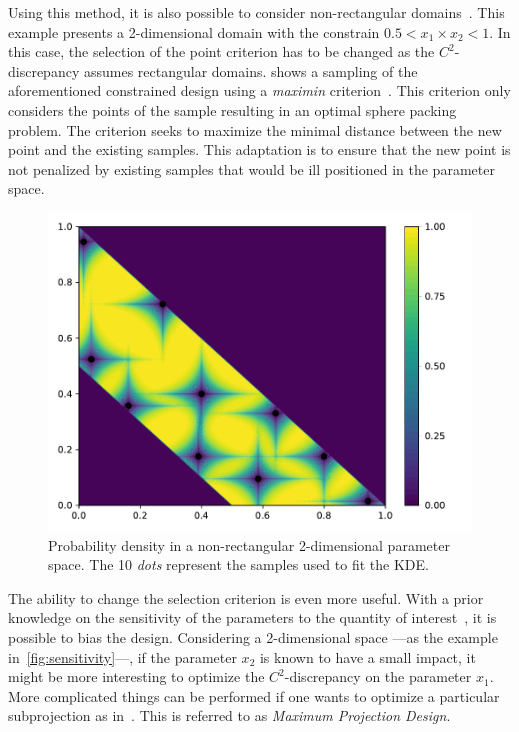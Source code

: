 Using this method, it is also possible to consider non-rectangular domains~\citep{Lekivetz2015}. This example presents a 2-dimensional domain with the constrain $0.5 < x_1 \times x_2 < 1$. In this case, the selection of the point criterion has to be changed as the $C^2$-discrepancy assumes rectangular domains.  shows a sampling of the aforementioned constrained design using a \emph{maximin} criterion~\citep{Fang2006}. This criterion only considers the points of the sample resulting in an optimal sphere packing problem. The criterion seeks to maximize the minimal distance between the new point and the existing samples. This adaptation is to ensure that the new point is not penalized by existing samples that would be ill positioned in the parameter space.

\begin{figure}[!ht]
\centering
\includegraphics[width=0.9\linewidth,keepaspectratio]{fig/contributions/doe/10_star_constrain.pdf}
\caption{Probability density in a non-rectangular 2-dimensional parameter space. The 10 \emph{dots} represent the samples used to fit the KDE.}
\label{fig:constrain}
\end{figure}

The ability to change the selection criterion is even more useful. With a prior knowledge on the sensitivity of the parameters to the quantity of interest~\citep{Saltelli2007}, it is possible to bias the design. Considering a 2-dimensional space ---\thinspace as the example in~\cref{fig:sensitivity}\thinspace---, if the parameter $x_2$ is known to have a small impact, it might be more interesting to optimize the $C^2$-discrepancy on the parameter $x_1$. More complicated things can be performed if one wants to optimize a particular subprojection as in~\citep{Joseph2015}. This is referred to as \emph{Maximum Projection Design}.

